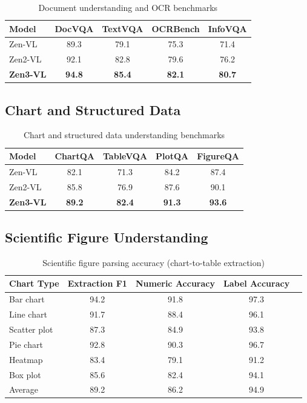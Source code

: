 \documentclass[11pt,a4paper]{article}
\begin{document}
\begin{table}[H]
\centering
\caption{Document understanding and OCR benchmarks}
\begin{tabular}{lcccc}
\toprule
\textbf{Model} & \textbf{DocVQA} & \textbf{TextVQA} & \textbf{OCRBench} & \textbf{InfoVQA} \\
\midrule
Zen-VL      & 89.3 & 79.1 & 75.3 & 71.4 \\
Zen2-VL     & 92.1 & 82.8 & 79.6 & 76.2 \\
\textbf{Zen3-VL} & \textbf{94.8} & \textbf{85.4} & \textbf{82.1} & \textbf{80.7} \\
\bottomrule
\end{tabular}
\label{tab:doc}
\end{table}

\subsection{Chart and Structured Data}

\begin{table}[H]
\centering
\caption{Chart and structured data understanding benchmarks}
\begin{tabular}{lcccc}
\toprule
\textbf{Model} & \textbf{ChartQA} & \textbf{TableVQA} & \textbf{PlotQA} & \textbf{FigureQA} \\
\midrule
Zen-VL      & 82.1 & 71.3 & 84.2 & 87.4 \\
Zen2-VL     & 85.8 & 76.9 & 87.6 & 90.1 \\
\textbf{Zen3-VL} & \textbf{89.2} & \textbf{82.4} & \textbf{91.3} & \textbf{93.6} \\
\bottomrule
\end{tabular}
\label{tab:chart}
\end{table}

\subsection{Scientific Figure Understanding}

\begin{table}[H]
\centering
\caption{Scientific figure parsing accuracy (chart-to-table extraction)}
\begin{tabular}{lcccc}
\toprule
\textbf{Chart Type} & \textbf{Extraction F1} & \textbf{Numeric Accuracy} & \textbf{Label Accuracy} \\
\midrule
Bar chart      & 94.2 & 91.8 & 97.3 \\
Line chart     & 91.7 & 88.4 & 96.1 \\
Scatter plot   & 87.3 & 84.9 & 93.8 \\
Pie chart      & 92.8 & 90.3 & 96.7 \\
Heatmap        & 83.4 & 79.1 & 91.2 \\
Box plot       & 85.6 & 82.4 & 94.1 \\
Average        & 89.2 & 86.2 & 94.9 \\
\bottomrule
\end{tabular}
\label{tab:scientific}
\end{table}
\end{document}
